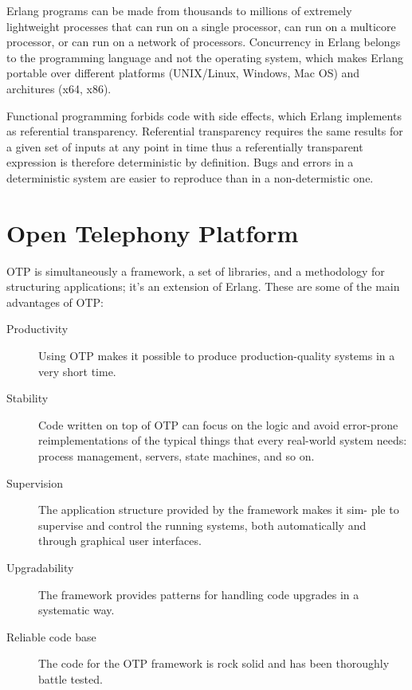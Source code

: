 Erlang programs can be made from thousands to millions of extremely lightweight processes that can run on a single processor, can run on a multicore processor, or can run on a network of processors. Concurrency in Erlang belongs to the programming language and not the operating system, which makes Erlang portable over different platforms  (UNIX/Linux, Windows, Mac OS) and architures (x64, x86). 

Functional programming forbids code with side effects, which Erlang implements as referential transparency. Referential transparency requires the same results for a given set of inputs at any point in time thus a referentially transparent expression is therefore deterministic by definition. Bugs and errors in a deterministic system are easier to reproduce than in a non-determistic one.


\section{Open Telephony Platform}
OTP is simultaneously a framework, a set of libraries, and a methodology for structuring applications; it’s an extension of Erlang.
These are some of the main advantages of OTP:
\begin{description}
\item[Productivity] Using OTP makes it possible to produce production-quality systems in a very short time.
\item[Stability] Code written on top of OTP can focus on the logic and avoid error-prone reimplementations of the typical things that every real-world system needs: process management, servers, state machines, and so on.
\item[Supervision] The application structure provided by the framework makes it sim- ple to supervise and control the running systems, both automatically and through graphical user interfaces.
\item[Upgradability] The framework provides patterns for handling code upgrades in a systematic way.
\item[Reliable code base] The code for the OTP framework is rock solid and has been thoroughly battle tested.
\end{description}

